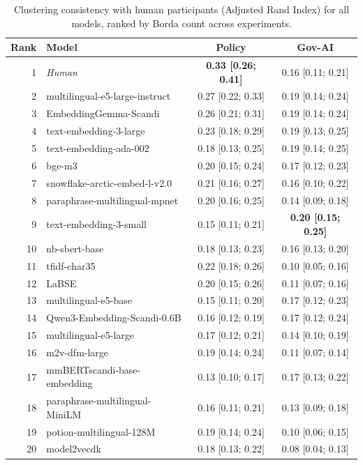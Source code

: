 \begin{table}[t]
\centering
\small
\caption{Clustering consistency with human participants (Adjusted Rand Index) for all models, ranked by Borda count across experiments.}\label{tab:cluster-consistency-adjusted-rand-index}
\begin{tabular}{rlcc}
\toprule
\textbf{Rank} & \textbf{Model} & \textbf{Policy} & \textbf{Gov-AI} \\
\midrule
1 & \emph{Human} & \textbf{0.33 [0.26; 0.41]} & 0.16 [0.11; 0.21] \\
2 & multilingual-e5-large-instruct & 0.27 [0.22; 0.33] & 0.19 [0.14; 0.24] \\
3 & EmbeddingGemma-Scandi & 0.26 [0.21; 0.31] & 0.19 [0.14; 0.24] \\
4 & text-embedding-3-large & 0.23 [0.18; 0.29] & 0.19 [0.13; 0.25] \\
5 & text-embedding-ada-002 & 0.18 [0.13; 0.25] & 0.19 [0.14; 0.25] \\
6 & bge-m3 & 0.20 [0.15; 0.24] & 0.17 [0.12; 0.23] \\
7 & snowflake-arctic-embed-l-v2.0 & 0.21 [0.16; 0.27] & 0.16 [0.10; 0.22] \\
8 & paraphrase-multilingual-mpnet & 0.20 [0.16; 0.25] & 0.14 [0.09; 0.18] \\
9 & text-embedding-3-small & 0.15 [0.11; 0.21] & \textbf{0.20 [0.15; 0.25]} \\
10 & nb-sbert-base & 0.18 [0.13; 0.23] & 0.16 [0.13; 0.20] \\
11 & tfidf-char35 & 0.22 [0.18; 0.26] & 0.10 [0.05; 0.16] \\
12 & LaBSE & 0.20 [0.15; 0.26] & 0.11 [0.07; 0.16] \\
13 & multilingual-e5-base & 0.15 [0.11; 0.20] & 0.17 [0.12; 0.23] \\
14 & Qwen3-Embedding-Scandi-0.6B & 0.16 [0.12; 0.19] & 0.17 [0.12; 0.24] \\
15 & multilingual-e5-large & 0.17 [0.12; 0.21] & 0.14 [0.10; 0.19] \\
16 & m2v-dfm-large & 0.19 [0.14; 0.24] & 0.11 [0.07; 0.14] \\
17 & mmBERTscandi-base-embedding & 0.13 [0.10; 0.17] & 0.17 [0.13; 0.22] \\
18 & paraphrase-multilingual-MiniLM & 0.16 [0.11; 0.21] & 0.13 [0.09; 0.18] \\
19 & potion-multilingual-128M & 0.19 [0.14; 0.24] & 0.10 [0.06; 0.15] \\
20 & model2vecdk & 0.18 [0.13; 0.22] & 0.08 [0.04; 0.13] \\

\end{tabular}
\end{table}
